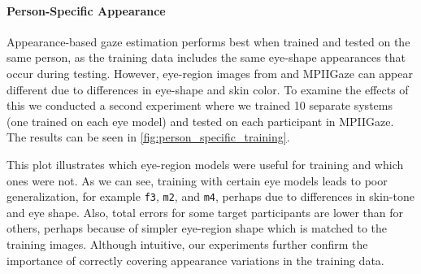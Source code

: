 \paragraph{Person-Specific Appearance}

Appearance-based gaze estimation performs best when trained and tested on the same person, as the training data includes the same eye-shape appearances that occur during testing.
However, eye-region images from \dataset and MPIIGaze can appear different due to differences in eye-shape and skin color.
To examine the effects of this we conducted a second experiment where we trained 10 separate systems (one trained on each \dataset eye model) and tested on each participant in MPIIGaze.
The results can be seen in \autoref{fig:person_specific_training}.

This plot illustrates which \dataset eye-region models were useful for training and which ones were not.
As we can see, training with certain eye models leads to poor generalization, for example \texttt{f3}, \texttt{m2}, and \texttt{m4}, perhaps due to differences in skin-tone and eye shape.
Also, total errors for some target participants are lower than for others, perhaps because of simpler eye-region shape which is matched to the training images.
Although intuitive, our experiments further confirm the importance of correctly covering appearance variations in the training data.



